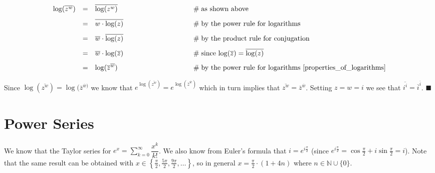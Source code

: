 \documentclass{article}
\theoremstyle{definition}
\begin{document}
\smallskip
\begin{equation*}
\begin{array}{llll}
\log(\overline{z^w})
&=& \overline{\log(z^w)}                        &\hspace{9em} \mathrel{\#} \text{as shown above} \\
[8pt]
&=& \overline{w  \cdot \log(z)}					&\hspace{9em} \mathrel{\#} \text{by the power rule for logarithms} \\
[8pt]
&=& \overline{w} \cdot \overline{\log(z)}       &\hspace{9em} \mathrel{\#} \text{by the product rule for conjugation} \\
[8pt]
&=& \overline{w} \cdot \log(\overline{z})       &\hspace{9em} \mathrel{\#} \text{since $\log (\overline{z}) 
												= \overline{\log(z)}$} \\
[8pt]
&=& \log(\overline{z}^{\overline{w}})           &\hspace{9em} \mathrel{\#} \text{by the power rule for 
												logarithms \cite{properties_of_logarithms}}
\end{array}
\end{equation*}

\bigskip
{
\noindent
Since $\log(\overline{z^w}) = \log(\overline{z}^{\overline{w})}$ we know that 
$e^{\log(\overline{z^w})} = e^{\log(\overline{z}^{\overline{w}})}$ which in turn 
implies that $\overline{z^w} = \overline{z}^{\overline{w}}$. Setting $z=w=i$ we 
see that $\overline{i^i} = {\overline{i}}^{\overline{i}}$. $\blacksquare$
\par}
\bigskip


\section{Power Series}
\label{sec:power_series}

{ We know that the Taylor series
\cite{wiki:taylor} for $e^x = \sum\limits_{k=0}^{\infty}
\dfrac{x^k}{k!}$.  We also know from Euler's formula
\cite{notes:eulers_formula} that $i = e^{i \frac{\pi}{2}}$ (since
$e^{i\frac{\pi}{2}} = \cos \frac{\pi}{2} + i \sin \frac{\pi}{2} =
i$).  Note that the same result can be obtained with $x \in \left
\{\frac{\pi}{2}, \frac{5 \pi}{2}, \frac{9\pi}{2}, \hdots \right
\}$, so in general $x = \frac{\pi}{2} \cdot (1+4n)$ where $n \in
\mathbb{N} \cup \{0\}$.  \par}
\end{document}
